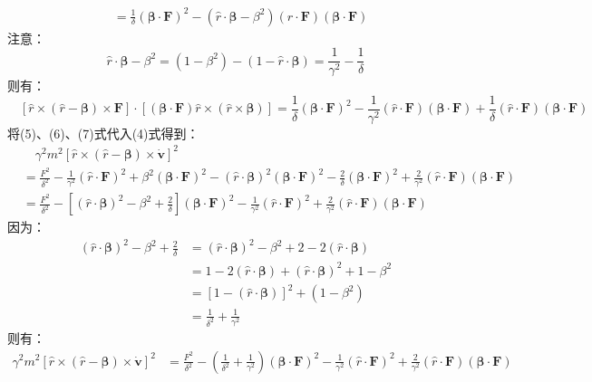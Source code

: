 \documentclass[a4paper,fontset=none]{ctexart}
\begin{document}
\begin{itemize}
\begin{align*}
        &= \frac{1}{\delta} (\bm{\beta} \cdot \bm{F})^2 - (\hat{r} \cdot \bm{\beta} - \beta^2) (\hat{r} \cdot \bm{F}) (\bm{\beta} \cdot \bm{F})
    \end{align*}
    注意：
    \[
        \hat{r} \cdot \bm{\beta} - \beta^2 = (1 - \beta^2) - (1 - \hat{r} \cdot \bm{\beta}) = \frac{1}{\gamma^2} - \frac{1}{\delta}
    \]
    则有：
    \begin{equation}
        \quad \left[\hat{r} \times (\hat{r}-\bm{\beta}) \times \bm{F}\right] \cdot \left[(\bm{\beta} \cdot \bm{F})\hat{r} \times (\hat{r} \times \bm{\beta})\right] = \frac{1}{\delta} (\bm{\beta} \cdot \bm{F})^2 - \frac{1}{\gamma^2} (\hat{r} \cdot \bm{F}) (\bm{\beta} \cdot \bm{F}) + \frac{1}{\delta} (\hat{r} \cdot \bm{F}) (\bm{\beta} \cdot \bm{F})
    \end{equation}
    将(5)、(6)、(7)式代入(4)式得到：
    \begin{align*}
        &\quad \gamma^2m^2 \left[\hat{r} \times (\hat{r}-\bm{\beta}) \times \dot{\bm{v}}\right]^2 \\
        &= \frac{F^2}{\delta^2} - \frac{1}{\gamma^2}(\hat{r} \cdot \bm{F})^2 + \beta^2 (\bm{\beta} \cdot \bm{F})^2 - (\hat{r} \cdot \bm{\beta})^2 (\bm{\beta} \cdot \bm{F})^2 - \frac{2}{\delta} (\bm{\beta} \cdot \bm{F})^2 + \frac{2}{\gamma^2} (\hat{r} \cdot \bm{F}) (\bm{\beta} \cdot \bm{F}) \\
        &= \frac{F^2}{\delta^2} - \left[(\hat{r} \cdot \bm{\beta})^2 - \beta^2 + \frac{2}{\delta}\right] (\bm{\beta} \cdot \bm{F})^2 - \frac{1}{\gamma^2}(\hat{r} \cdot \bm{F})^2 + \frac{2}{\gamma^2} (\hat{r} \cdot \bm{F}) (\bm{\beta} \cdot \bm{F})
    \end{align*}
    因为：
    \begin{align*}
        (\hat{r} \cdot \bm{\beta})^2 - \beta^2 + \frac{2}{\delta}
        &= (\hat{r} \cdot \bm{\beta})^2 - \beta^2 + 2 - 2(\hat{r} \cdot \bm{\beta}) \\
        &= 1 - 2(\hat{r} \cdot \bm{\beta}) + (\hat{r} \cdot \bm{\beta})^2 + 1 - \beta^2 \\
        &= \left[1 - (\hat{r} \cdot \bm{\beta})\right]^2 + \left(1 - \beta^2\right) \\
        &= \frac{1}{\delta^2} + \frac{1}{\gamma^2}
    \end{align*}
    则有：
    \begin{align*}
        \gamma^2m^2 \left[\hat{r} \times (\hat{r}-\bm{\beta}) \times \dot{\bm{v}}\right]^2
        &= \frac{F^2}{\delta^2} - \left(\frac{1}{\delta^2} + \frac{1}{\gamma^2}\right) (\bm{\beta} \cdot \bm{F})^2 - \frac{1}{\gamma^2}(\hat{r} \cdot \bm{F})^2 + \frac{2}{\gamma^2} (\hat{r} \cdot \bm{F}) (\bm{\beta} \cdot \bm{F}) \\

\end{align*}
\end{itemize}
\end{document}

